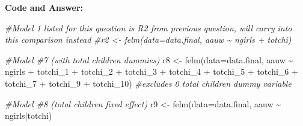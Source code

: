 \documentclass[
]{article}
\newenvironment{Shaded}{\begin{snugshade}}{\end{snugshade}}
\newcommand{\AttributeTok}[1]{\textcolor[rgb]{0.77,0.63,0.00}{#1}}
\newcommand{\CommentTok}[1]{\textcolor[rgb]{0.56,0.35,0.01}{\textit{#1}}}
\newcommand{\DecValTok}[1]{\textcolor[rgb]{0.00,0.00,0.81}{#1}}
\newcommand{\FunctionTok}[1]{\textcolor[rgb]{0.00,0.00,0.00}{#1}}
\newcommand{\NormalTok}[1]{#1}
\newcommand{\OtherTok}[1]{\textcolor[rgb]{0.56,0.35,0.01}{#1}}
\newcommand{\SpecialCharTok}[1]{\textcolor[rgb]{0.00,0.00,0.00}{#1}}
\newcommand{\StringTok}[1]{\textcolor[rgb]{0.31,0.60,0.02}{#1}}
\begin{document}
\begin{Shaded}
\end{Shaded}

\textbf{Code and Answer:}

\begin{Shaded}
\begin{Highlighting}[]
\CommentTok{\#Model 1 listed for this question is R2 from previous question, will carry into this comparison instead}
\CommentTok{\#r2 \textless{}{-} felm(data=data.final, aauw \textasciitilde{} ngirls + totchi)}

\CommentTok{\#Model \#7 (with total children dummies)}
\NormalTok{r8 }\OtherTok{\textless{}{-}} \FunctionTok{felm}\NormalTok{(}\AttributeTok{data=}\NormalTok{data.final, aauw }\SpecialCharTok{\textasciitilde{}}\NormalTok{ ngirls }\SpecialCharTok{+}\NormalTok{ totchi\_1 }\SpecialCharTok{+}\NormalTok{ totchi\_2 }\SpecialCharTok{+}\NormalTok{ totchi\_3 }\SpecialCharTok{+}\NormalTok{ totchi\_4 }\SpecialCharTok{+}\NormalTok{ totchi\_5 }\SpecialCharTok{+}\NormalTok{ totchi\_6 }\SpecialCharTok{+}\NormalTok{ totchi\_7 }\SpecialCharTok{+}\NormalTok{ totchi\_9 }\SpecialCharTok{+}\NormalTok{ totchi\_10)}
\CommentTok{\#excludes 0 total children dummy variable}

\CommentTok{\#Model \#8 (total children fixed effect)}
\NormalTok{r9 }\OtherTok{\textless{}{-}} \FunctionTok{felm}\NormalTok{(}\AttributeTok{data=}\NormalTok{data.final, aauw }\SpecialCharTok{\textasciitilde{}}\NormalTok{ ngirls}\SpecialCharTok{|}\NormalTok{totchi)}


\end{Highlighting}
\end{Shaded}
\end{document}
